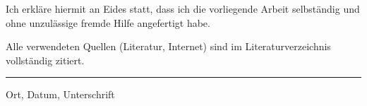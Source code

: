 
Ich erkläre hiermit an Eides statt, dass ich die vorliegende Arbeit selbständig und ohne unzulässige fremde Hilfe angefertigt habe. 

Alle verwendeten Quellen (Literatur, Internet) sind im Literaturverzeichnis vollständig zitiert.


\vspace{4cm}

\rule{12cm}{0.4pt}

Ort, Datum, Unterschrift